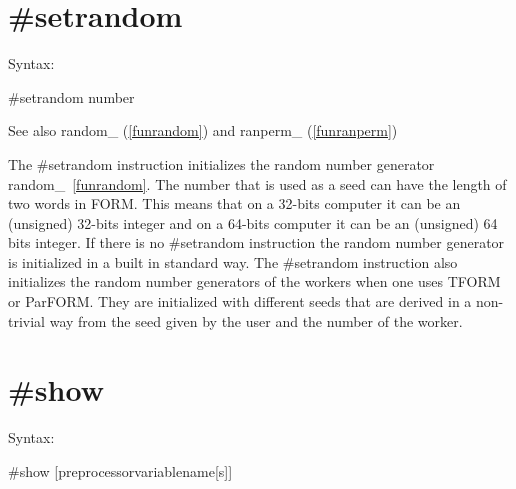 
\section{\#setrandom}
\label{presetrandom}

\noindent Syntax:

\#setrandom number
 
\noindent See also random\_ (\ref{funrandom}) and ranperm\_ (\ref{funranperm})

\noindent The \#setrandom instruction initializes the 
random number generator 
random\_~\ref{funrandom}. The 
number that is used as a seed can have the length of two words in FORM. 
This means that on a 32-bits computer it can be an (unsigned) 32-bits 
integer and on a 64-bits computer it can be an (unsigned) 64 bits integer. 
If there is no \#setrandom instruction the random number generator is 
initialized in a built in standard way. The \#setrandom instruction also 
initializes the random number generators of the workers when one uses TFORM 
or ParFORM. They are initialized with different seeds that are derived in a 
non-trivial way from the seed given by the user and the number of the 
worker.


\section{\#show}
\label{preshow}

\noindent Syntax:

\#show [preprocessorvariablename[s]]

